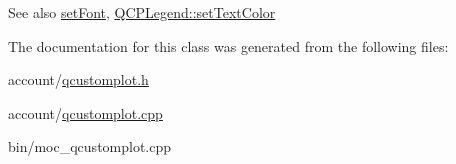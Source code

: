 \begin{DoxySeeAlso}{\-See also}
\hyperlink{classQCPAbstractLegendItem_a409c53455d8112f71d70c0c43eb10265}{set\-Font}, \hyperlink{classQCPLegend_ae1eb239ff4a4632fe1b6c3e668d845c6}{\-Q\-C\-P\-Legend\-::set\-Text\-Color} 
\end{DoxySeeAlso}


\-The documentation for this class was generated from the following files\-:\begin{DoxyCompactItemize}
\item 
account/\hyperlink{qcustomplot_8h}{qcustomplot.\-h}\item 
account/\hyperlink{qcustomplot_8cpp}{qcustomplot.\-cpp}\item 
bin/moc\-\_\-qcustomplot.\-cpp\end{DoxyCompactItemize}
